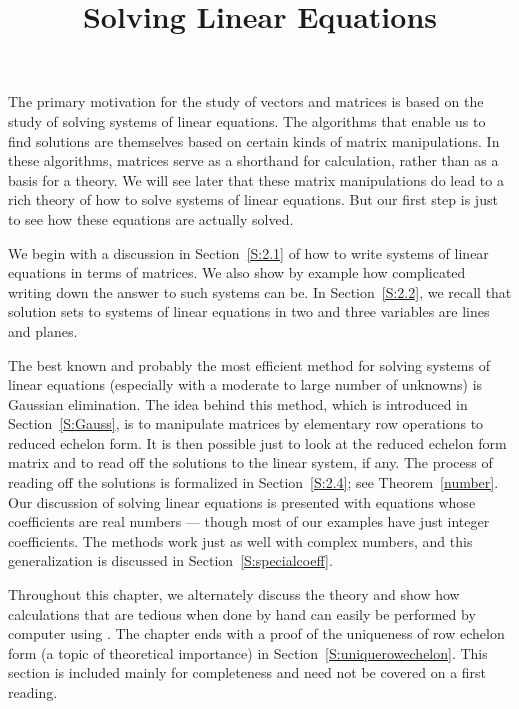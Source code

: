 \documentclass{ximera}
\title{Solving Linear Equations}
\begin{document}
\begin{abstract}
\end{abstract}
\maketitle

 \label{lineq}

\normalsize

The primary motivation for the study of vectors and matrices is based
on the study of solving systems of linear equations.  The algorithms
that enable us to find solutions are themselves based on certain kinds
of matrix manipulations.  In these algorithms, matrices serve as a
shorthand for calculation, rather than as a basis for a theory.  We will
see later that these matrix manipulations do lead to a rich theory of how
to solve systems of linear equations.  But our first step is just to see
how these equations are actually solved.

We begin with a discussion in Section~\ref{S:2.1} of how to write systems
of linear equations in terms of matrices.  We also show by example how
complicated writing down the answer to such systems can be.  In
Section~\ref{S:2.2}, we recall that solution sets to systems of linear
equations in two and three variables are lines and planes.

The best known and probably the most efficient method for solving
systems of linear equations (especially with a moderate to large number
of unknowns) is Gaussian elimination.  The idea behind this method,
which is introduced in Section~\ref{S:Gauss}, is to manipulate matrices
by elementary row operations to reduced echelon form.  It is then possible
just to look at the reduced echelon form matrix and to read off the
solutions to the linear system, if any.  The process of reading off the
solutions is formalized in Section~\ref{S:2.4}; see Theorem~\ref{number}.
Our discussion of solving linear equations is presented with equations
whose coefficients are real numbers --- though most of our examples have
just integer coefficients.  The methods work just as well with complex
numbers, and this generalization is discussed in Section~\ref{S:specialcoeff}.

Throughout this chapter, we alternately discuss the theory and show how
calculations that are tedious when done by hand can easily be performed
by computer using \Matlabp.  The chapter ends with a proof of the
uniqueness of row echelon form (a topic of theoretical importance) in
Section~\ref{S:uniquerowechelon}.  This section is included mainly for
completeness and need not be covered on a first reading.
\end{document}
